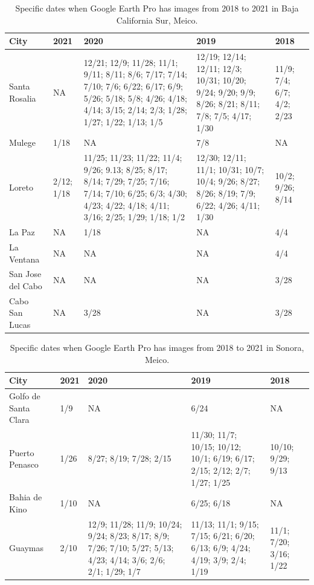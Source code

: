 \begin{table}[p]
\centering
\begin{tabular}{ l | p{2.5cm} | p{2.5cm} | p{2.5cm} | p{2.5cm} }
\toprule
City & 2021 & 2020 & 2019 & 2018 \\
\midrule
Santa Rosalia & NA & 12/21; 12/9; 11/28; 11/1; 9/11; 8/11; 8/6; 7/17; 7/14; 7/10; 7/6; 6/22; 6/17; 6/9; 5/26; 5/18; 5/8; 4/26; 4/18; 4/14; 3/15; 2/14; 2/3; 1/28; 1/27; 1/22; 1/13; 1/5 & 12/19; 12/14; 12/11; 12/3; 10/31; 10/20; 9/24; 9/20; 9/9; 8/26; 8/21; 8/11; 7/8; 7/5; 4/17; 1/30 & 11/9; 7/4; 6/7; 4/2; 2/23\\
\midrule
Mulege & 1/18 & NA & 7/8 & NA\\
\midrule
Loreto & 2/12; 1/18 & 11/25; 11/23; 11/22; 11/4; 9/26; 9.13; 8/25; 8/17; 8/14; 7/29; 7/25; 7/16; 7/14; 7/10; 6/25; 6/3; 4/30; 4/23; 4/22; 4/18; 4/11; 3/16; 2/25; 1/29; 1/18; 1/2 & 12/30; 12/11; 11/1; 10/31; 10/7; 10/4; 9/26; 8/27; 8/26; 8/19; 7/9; 6/22; 4/26; 4/11; 1/30 & 10/2; 9/26; 8/14\\
\midrule
La Paz & NA & 1/18 & NA & 4/4\\
\midrule
La Ventana & NA & NA & NA & 4/4\\
\midrule
San Jose del Cabo & NA & NA & NA & 3/28\\
\midrule
Cabo San Lucas & NA & 3/28 & NA & 3/28\\
\bottomrule
\end{tabular}
\caption{Specific dates when Google Earth Pro has images from 2018 to 2021 in Baja California Sur, Meico.}
\label{table:Baja_California_Sur_dates}
\end{table}


\begin{table}[p]
\centering
\begin{tabular}{ l | p{2.5cm} | p{2.5cm} | p{2.5cm} | p{2.5cm} }
\toprule
City & 2021 & 2020 & 2019 & 2018 \\
\midrule
Golfo de Santa Clara & 1/9 & NA & 6/24 & NA\\
\midrule
Puerto Penasco & 1/26 & 8/27; 8/19; 7/28; 2/15 & 11/30; 11/7; 10/15; 10/12; 10/1; 6/19; 6/17; 2/15; 2/12; 2/7; 1/27; 1/25 & 10/10; 9/29; 9/13\\
\midrule
Bahia de Kino & 1/10 & NA & 6/25; 6/18 & NA\\
\midrule
Guaymas & 2/10 & 12/9; 11/28; 11/9; 10/24; 9/24; 8/23; 8/17; 8/9; 7/26; 7/10; 5/27; 5/13; 4/23; 4/14; 3/6; 2/6; 2/1; 1/29; 1/7 & 11/13; 11/1; 9/15; 7/15; 6/21; 6/20; 6/13; 6/9; 4/24; 4/19; 3/9; 2/4; 1/19 & 11/1; 7/20; 3/16; 1/22\\
\bottomrule
\end{tabular}
\caption{Specific dates when Google Earth Pro has images from 2018 to 2021 in Sonora, Meico.}
\label{table:Sonora_dates}
\end{table}



